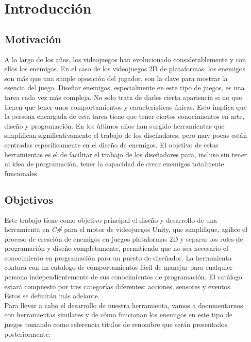 \chapter{Introducción}
\label{cap:introduccion}


\section{Motivación}
A lo largo de los años, los videojuegos han evolucionado considerablemente y con ellos los enemigos. En el caso de los videojuegos 2D de plataformas, los enemigos son más que una simple oposición del jugador, son la clave para mostrar la esencia del juego. Diseñar enemigos, especialmente en este tipo de juegos, es una tarea cada vez más compleja. No solo trata de darles cierta apariencia si no que tienen que tener unos comportamientos y características únicas.  Esto implica que la persona encargada de esta tarea tiene que tener ciertos conocimientos en arte, diseño y programación. En los últimos años han surgido herramientas que simplifican significativamente el trabajo de los diseñadores, pero muy pocas están centradas específicamente en el diseño de enemigos. El objetivo de estas herramientas es el de facilitar el trabajo de los diseñadores para, incluso sin tener ni idea de programación, tener la capacidad de crear enemigos totalmente funcionales.

\section{Objetivos}
Este trabajo tiene como objetivo principal el diseño y desarrollo de una herramienta en  \textit{C\#} para el motor de videojuegos Unity, que simplifique, agilice el proceso de creación de enemigos en juegos plataformas 2D y separar los roles de programación y diseño completamente, permitiendo que no sea necesario el conocimiento en programación para un puesto de diseñador.
La herramienta contará con un catalogo de comportamientos fácil de manejar para cualquier persona independientemente de sus conocimientos de programación. El catálogo estará compuesto por tres categorías diferentes: acciones, sensores y eventos. Estos se definirán más adelante. \\
Para llevar a cabo el desarrollo de nuestra herramienta, vamos a documentarnos con herramientas similares y de cómo funcionan los enemigos en este tipo de juegos tomando como referencia títulos de renombre que serán presentados posteriormente.


